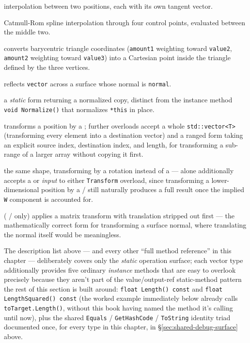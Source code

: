 \begin{description}
  interpolation between two positions, each with its own tangent vector.
\item[\texttt{CatmullRom(value1, value2, value3, value4, amount)}] Catmull-Rom spline
  interpolation through four control points, evaluated between the middle two.
\item[\texttt{Barycentric(value1, value2, value3, amount1, amount2)}] converts barycentric
  triangle coordinates (\texttt{amount1} weighting toward \texttt{value2}, \texttt{amount2}
  weighting toward \texttt{value3}) into a Cartesian point inside the triangle defined by the
  three vertices.
\item[\texttt{Reflect(vector, normal)}] reflects \texttt{vector} across a surface whose normal
  is \texttt{normal}.
\item[\texttt{Normalize(value)}] a \emph{static} form returning a normalized copy, distinct from
  the instance method \texttt{void Normalize()} that normalizes \texttt{*this} in place.
\item[\texttt{Transform(position, matrix)}] transforms a position by a ;
  further overloads accept a whole \texttt{std::vector<T>} (transforming every element into a
  destination vector) and a ranged form taking an explicit source index, destination index, and
  length, for transforming a sub-range of a larger array without copying it first.
\item[\texttt{Transform(value, rotation)}] the same shape, transforming by a
   rotation instead of a  ---  alone
  additionally accepts a  or  \emph{input} to either
  \texttt{Transform} overload, since transforming a lower-dimensional position by a
   /  still naturally produces a full 
  result once the implied \texttt{W} component is accounted for.
\item[\texttt{TransformNormal(normal, matrix)}] ( /  only)
  applies a matrix transform with translation stripped out first --- the mathematically correct
  form for transforming a surface normal, where translating the normal itself would be
  meaningless.
\end{description}

The description list above --- and every other ``full method reference'' in this chapter ---
deliberately covers only the \emph{static} operation surface; each vector type additionally
provides five ordinary \emph{instance} methods that are easy to overlook precisely because
they aren't part of the value/output-ref static-method pattern the rest of this section is
built around: \texttt{float Length() const} and \texttt{float LengthSquared() const} (the
worked example immediately below already calls \texttt{toTarget.Length()}, without this book
having named the method it's calling until now), plus the shared
\texttt{Equals} / \texttt{GetHashCode} / \texttt{ToString} identity triad documented once, for
every type in this chapter, in \S\ref{sec:shared-debug-surface} above.

